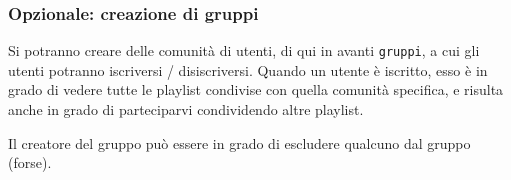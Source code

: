 \subsubsection{Opzionale: creazione di gruppi}
Si potranno creare delle comunità di utenti, di qui in avanti \verb|gruppi|, a cui gli utenti potranno iscriversi / disiscriversi. Quando un utente è iscritto, esso è in grado di vedere tutte le playlist condivise con quella comunità specifica, e risulta anche in grado di parteciparvi condividendo altre playlist.

Il creatore del gruppo può essere in grado di escludere qualcuno dal gruppo (forse).
\newpage